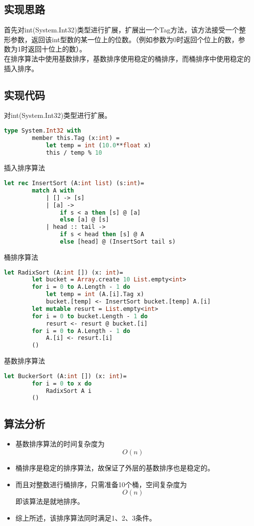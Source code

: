 \documentclass[a4paper]{article}
\begin{document}
\subsection{实现思路}

首先对int(System.Int32)类型进行扩展，扩展出一个Tag方法，该方法接受一个整形参数，返回该int型数的某一位上的位数。（例如参数为0时返回个位上的数，参数为1时返回十位上的数）。\\
在排序算法中使用基数排序，基数排序使用稳定的桶排序，而桶排序中使用稳定的插入排序。

\subsection{实现代码}

对int(System.Int32)类型进行扩展。

\begin{lstlisting}[language=ML]
    type System.Int32 with
        member this.Tag (x:int) =
            let temp = int (10.0**float x)
            this / temp % 10
\end{lstlisting}

插入排序算法

\begin{lstlisting}[language=ML]
    let rec InsertSort (A:int list) (s:int)=
        match A with
            | [] -> [s]
            | [a] -> 
                if s < a then [s] @ [a]
                else [a] @ [s]
            | head :: tail ->
                if s < head then [s] @ A
                else [head] @ (InsertSort tail s)
\end{lstlisting}

桶排序算法

\begin{lstlisting}[language=ML]
    let RadixSort (A:int []) (x: int)= 
        let bucket = Array.create 10 List.empty<int>
        for i = 0 to A.Length - 1 do
            let temp = int (A.[i].Tag x)
            bucket.[temp] <- InsertSort bucket.[temp] A.[i]
        let mutable resurt = List.empty<int>
        for i = 0 to bucket.Length - 1 do
            resurt <- resurt @ bucket.[i]
        for i = 0 to A.Length - 1 do
            A.[i] <- resurt.[i]
        ()
\end{lstlisting}

基数排序算法

\begin{lstlisting}[language=ML]
    let BuckerSort (A:int []) (x: int)=
        for i = 0 to x do
            RadixSort A i
        ()
\end{lstlisting}

\subsection{算法分析}

\begin{itemize}
\item
  基数排序算法的时间复杂度为 \[ O(n)\]
\item
  桶排序是稳定的排序算法，故保证了外层的基数排序也是稳定的。
\item
  而且对整数进行桶排序，只需准备10个桶，空间复杂度为\[O(n)\] 即该算法是就地排序。
\item
  综上所述，该排序算法同时满足1、2、3条件。
\end{itemize}
\end{document}
